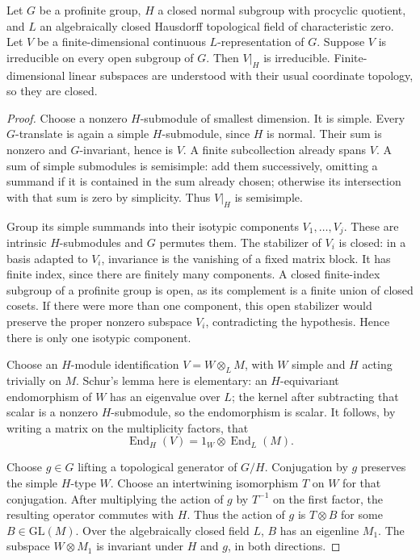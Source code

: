 \begin{srlemma}\label{lem:sr-procyclic-restriction}
Let \(G\) be a profinite group, \(H\) a closed normal subgroup
with procyclic quotient, and \(L\) an algebraically closed
Hausdorff topological field of characteristic zero.
Let \(V\) be a finite-dimensional continuous \(L\)-representation
of \(G\).
Suppose \(V\) is irreducible on every open subgroup of \(G\).
Then \(V|_H\) is irreducible.
Finite-dimensional linear subspaces are understood with their
usual coordinate topology, so they are closed.
\end{srlemma}
\begin{proof}
Choose a nonzero \(H\)-submodule of smallest dimension.
It is simple. Every \(G\)-translate is again a simple
\(H\)-submodule, since \(H\) is normal.
Their sum is nonzero and \(G\)-invariant, hence is \(V\).
A finite subcollection already spans \(V\).
A sum of simple submodules is semisimple: add them successively,
omitting a summand if it is contained in the sum already chosen;
otherwise its intersection with that sum is zero by simplicity.
Thus \(V|_H\) is semisimple.

Group its simple summands into their isotypic components
\(V_1,\ldots,V_j\). These are intrinsic \(H\)-submodules and \(G\)
permutes them.
The stabilizer of \(V_i\) is closed: in a basis adapted to
\(V_i\), invariance is the vanishing of a fixed matrix block.
It has finite index, since there are finitely many components.
A closed finite-index subgroup of a profinite group is open,
as its complement is a finite union of closed cosets.
If there were more than one component, this open stabilizer
would preserve the proper nonzero subspace \(V_i\), contradicting
the hypothesis. Hence there is only one isotypic component.

Choose an \(H\)-module identification \(V=W\otimes_L M\), with
\(W\) simple and \(H\) acting trivially on \(M\).
Schur's lemma here is elementary: an \(H\)-equivariant endomorphism
of \(W\) has an eigenvalue over \(L\); the kernel after subtracting
that scalar is a nonzero \(H\)-submodule, so the endomorphism is scalar.
It follows, by writing a matrix on the multiplicity factors, that
\[
                 \operatorname{End}_H(V)
                           =1_W\otimes\operatorname{End}_L(M).
\]

Choose \(g\in G\) lifting a topological generator of \(G/H\).
Conjugation by \(g\) preserves the simple \(H\)-type \(W\).
Choose an intertwining isomorphism \(T\) on \(W\) for that conjugation.
After multiplying the action of \(g\) by \(T^{-1}\) on the first
factor, the resulting operator commutes with \(H\).
Thus the action of \(g\) is \(T\otimes B\) for some
\(B\in\mathrm{GL}(M)\).
Over the algebraically closed field \(L\), \(B\) has an eigenline
\(M_1\). The subspace \(W\otimes M_1\) is invariant under \(H\)
and \(g\), in both directions.


\end{proof}
